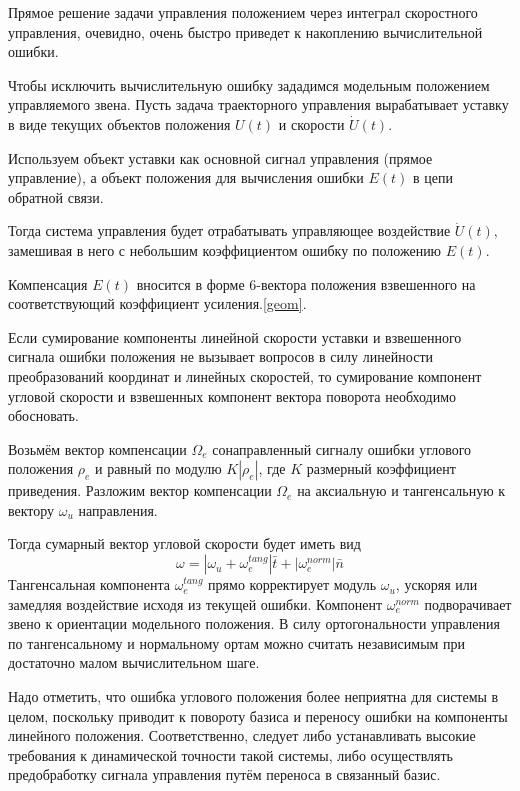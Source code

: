 Прямое решение задачи управления положением через интеграл скоростного управления, очевидно, очень быстро приведет к накоплению вычислительной ошибки.

Чтобы исключить вычислительную ошибку зададимся модельным положением управляемого звена. Пусть задача траекторного управления вырабатывает уставку в виде текущих объектов положения $U(t)$ и скорости $\dot{U}(t)$.

Используем объект уставки как основной сигнал управления (прямое управление), а объект положения для вычисления ошибки $E(t)$ в цепи обратной связи.

Тогда система управления будет отрабатывать управляющее воздействие $\dot{U}(t)$, замешивая в него с небольшим коэффициентом ошибку по положению $E(t)$.

Компенсация $E(t)$ вносится в форме 6-вектора положения взвешенного на соответствующий коэффициент усиления.\ref{geom}. 

Если сумирование компоненты линейной скорости уставки и взвешенного сигнала ошибки положения не вызывает вопросов в силу линейности преобразований координат и линейных скоростей, то сумирование компонент угловой скорости и взвешенных компонент вектора поворота необходимо обосновать.

Возьмём вектор компенсации $\Omega_e$ сонаправленный сигналу ошибки углового положения $\rho_e$ и равный по модулю $K|\rho_e|$, где $K$ размерный коэффициент приведения.
Разложим вектор компенсации $\Omega_e$ на аксиальную и тангенсальную к вектору $\omega_u$ направления.   

Тогда сумарный вектор угловой скорости будет иметь вид 
\begin{equation}
\omega = |\omega_u + \omega_e^{tang}|\bar{t} + |\omega_e^{norm}|\bar{n}
\end{equation} 
Тангенсальная компонента $\omega_e^{tang}$ прямо корректирует модуль $\omega_u$, ускоряя или замедляя воздействие исходя из текущей ошибки. Компонент $\omega_e^{norm}$ подворачивает звено к ориентации модельного положения. В силу ортогональности управления по тангенсальному и нормальному ортам можно считать независимым при достаточно малом вычислительном шаге.

Надо отметить, что ошибка углового положения более неприятна для системы в целом, поскольку приводит к повороту базиса и переносу ошибки на компоненты линейного положения. Соответственно, следует либо устанавливать высокие требования к динамической точности такой системы, либо осуществлять предобработку сигнала управления путём переноса в связанный базис. 

